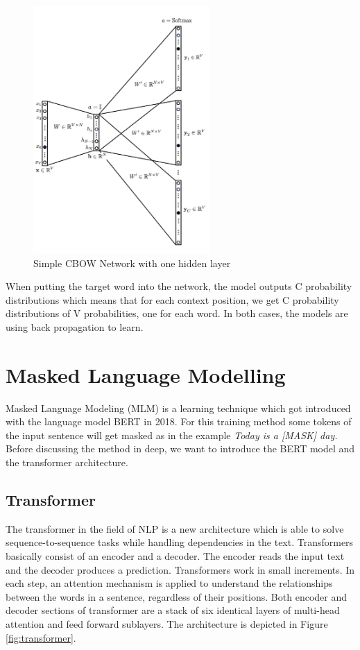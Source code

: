 \begin{figure}[H]
	\centering
	\includegraphics[width=0.6\textwidth]{figures/sgram_network.png}
	\caption{Simple CBOW Network with one hidden layer}
	\label{fig:sgram_network}
\end{figure}

When putting the target word into the network, the model outputs C probability distributions which means that for each context position, we get C probability distributions of V probabilities, one for each word.
\newline
In both cases, the models are using back propagation to learn.

\section{Masked Language Modelling}
Masked Language Modeling (MLM) is a learning technique which got introduced with the language model BERT in 2018. For this training method some tokens of the input sentence will get masked as in the example \textit{Today is a [MASK] day.} Before discussing the method in deep, we want to introduce the BERT model and the transformer architecture.

\subsection{Transformer} \label{chap:transformer}
The transformer in the field of NLP is a new architecture which is able to solve sequence-to-sequence tasks while handling dependencies in the text. Transformers basically consist of an encoder and a decoder. The encoder reads the input text and the decoder produces a prediction. Transformers work in small increments. In each step, an attention mechanism is applied to understand the relationships between the words in a sentence, regardless of their positions. Both encoder and decoder sections of transformer are a stack of six identical layers of multi-head attention and feed forward sublayers. The architecture is depicted in Figure \ref{fig:transformer}.

